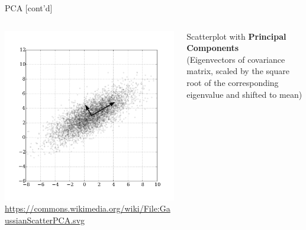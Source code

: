 \documentclass[ignorenonframetext,xcolor=x11names]{beamer}
\begin{document}
\begin{frame}{PCA \small [cont'd]}
\begin{columns}
\begin{column}{.7\textwidth}
\includegraphics[width=\textwidth]{GaussianScatterPCA.svg.png} \\
\scriptsize
\url{https://commons.wikimedia.org/wiki/File:GaussianScatterPCA.svg} \\
\end{column}
\begin{column}{.3\textwidth}
Scatterplot with \textbf{Principal Components}  \\
\vspace{\baselineskip}
(Eigenvectors of covariance matrix, scaled by the square root of the corresponding eigenvalue and shifted to mean)
\end{column}
\end{columns}
\end{frame}
\end{document}
